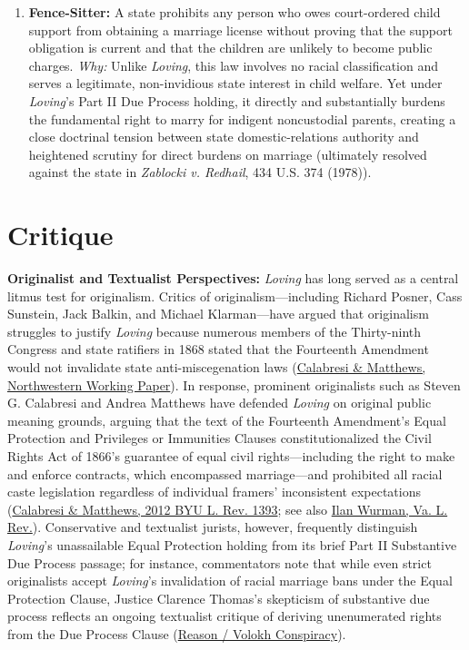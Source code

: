 \documentclass[12pt]{article}
\begin{document}
\begin{enumerate}
\item \textbf{Fence-Sitter:} A state prohibits any person who owes court-ordered child support from obtaining a marriage license without proving that the support obligation is current and that the children are unlikely to become public charges. \textit{Why:} Unlike \textit{Loving}, this law involves no racial classification and serves a legitimate, non-invidious state interest in child welfare. Yet under \textit{Loving}'s Part II Due Process holding, it directly and substantially burdens the fundamental right to marry for indigent noncustodial parents, creating a close doctrinal tension between state domestic-relations authority and heightened scrutiny for direct burdens on marriage (ultimately resolved against the state in \textit{Zablocki v. Redhail}, 434 U.S. 374 (1978)).
\end{enumerate}

\section{Critique}
\textbf{Originalist and Textualist Perspectives:} \textit{Loving} has long served as a central litmus test for originalism. Critics of originalism---including Richard Posner, Cass Sunstein, Jack Balkin, and Michael Klarman---have argued that originalism struggles to justify \textit{Loving} because numerous members of the Thirty-ninth Congress and state ratifiers in 1868 stated that the Fourteenth Amendment would not invalidate state anti-miscegenation laws (\href{https://scholarlycommons.law.northwestern.edu/cgi/viewcontent.cgi?article=1205&context=facultyworkingpapers}{Calabresi \& Matthews, Northwestern Working Paper}). In response, prominent originalists such as Steven G. Calabresi and Andrea Matthews have defended \textit{Loving} on original public meaning grounds, arguing that the text of the Fourteenth Amendment's Equal Protection and Privileges or Immunities Clauses constitutionalized the Civil Rights Act of 1866's guarantee of equal civil rights---including the right to make and enforce contracts, which encompassed marriage---and prohibited all racial caste legislation regardless of individual framers' inconsistent expectations (\href{https://digitalcommons.law.byu.edu/lawreview/vol2012/iss5/1/}{Calabresi \& Matthews, 2012 BYU L. Rev. 1393}; see also \href{https://virginialawreview.org/authors/ilan-wurman/}{Ilan Wurman, Va. L. Rev.}). Conservative and textualist jurists, however, frequently distinguish \textit{Loving}'s unassailable Equal Protection holding from its brief Part II Substantive Due Process passage; for instance, commentators note that while even strict originalists accept \textit{Loving}'s invalidation of racial marriage bans under the Equal Protection Clause, Justice Clarence Thomas's skepticism of substantive due process reflects an ongoing textualist critique of deriving unenumerated rights from the Due Process Clause (\href{https://reason.com/volokh/2022/06/28/justice-thomas-and-loving-v-virginia/}{Reason / Volokh Conspiracy}).
\end{document}
